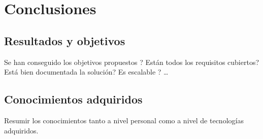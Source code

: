 \chapter{Conclusiones}
\section{Resultados  y objetivos}
Se han conseguido los objetivos propuestos ? Están todos los requisitos cubiertos? Está bien documentada la solución? Es escalable ? …

\section{Conocimientos adquiridos}
Resumir los conocimientos tanto a nivel personal como a nivel de tecnologías adquiridos.
 

 
